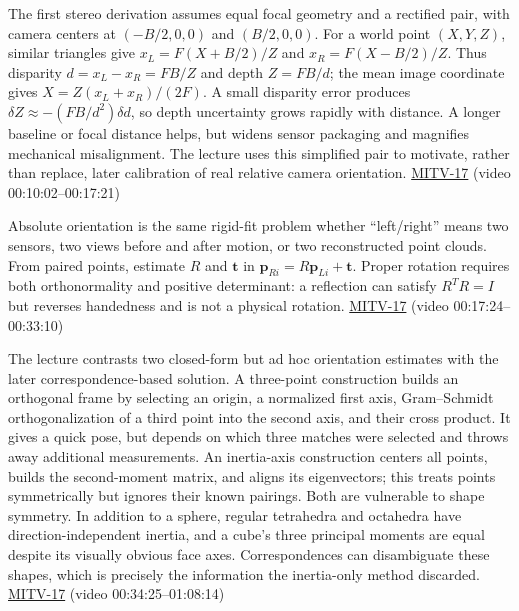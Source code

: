 The first stereo derivation assumes equal focal geometry and a rectified pair, with camera centers at \((-B/2,0,0)\) and \((B/2,0,0)\). For a world point \((X,Y,Z)\), similar triangles give \(x_L=F(X+B/2)/Z\) and \(x_R=F(X-B/2)/Z\). Thus disparity \(d=x_L-x_R=FB/Z\) and depth \(Z=FB/d\); the mean image coordinate gives \(X=Z(x_L+x_R)/(2F)\). A small disparity error produces \(\delta Z\approx-(FB/d^2)\delta d\), so depth uncertainty grows rapidly with distance. A longer baseline or focal distance helps, but widens sensor packaging and magnifies mechanical misalignment. The lecture uses this simplified pair to motivate, rather than replace, later calibration of real relative camera orientation. \hyperref[04-visual-computing-ii-ch036-mitv-17---photogrammetry-orientation-axes-of-inertia-symmetry-orientation]{MITV-17} (video 00:10:02--00:17:21)

Absolute orientation is the same rigid-fit problem whether ``left/right'' means two sensors, two views before and after motion, or two reconstructed point clouds. From paired points, estimate \(R\) and \(\mathbf{t}\) in \(\mathbf{p}_{Ri}=R\mathbf{p}_{Li}+\mathbf{t}\). Proper rotation requires both orthonormality and positive determinant: a reflection can satisfy \(R^TR=I\) but reverses handedness and is not a physical rotation. \hyperref[04-visual-computing-ii-ch036-mitv-17---photogrammetry-orientation-axes-of-inertia-symmetry-orientation]{MITV-17} (video 00:17:24--00:33:10)

The lecture contrasts two closed-form but ad hoc orientation estimates with the later correspondence-based solution. A three-point construction builds an orthogonal frame by selecting an origin, a normalized first axis, Gram--Schmidt orthogonalization of a third point into the second axis, and their cross product. It gives a quick pose, but depends on which three matches were selected and throws away additional measurements. An inertia-axis construction centers all points, builds the second-moment matrix, and aligns its eigenvectors; this treats points symmetrically but ignores their known pairings. Both are vulnerable to shape symmetry. In addition to a sphere, regular tetrahedra and octahedra have direction-independent inertia, and a cube's three principal moments are equal despite its visually obvious face axes. Correspondences can disambiguate these shapes, which is precisely the information the inertia-only method discarded. \hyperref[04-visual-computing-ii-ch036-mitv-17---photogrammetry-orientation-axes-of-inertia-symmetry-orientation]{MITV-17} (video 00:34:25--01:08:14)

